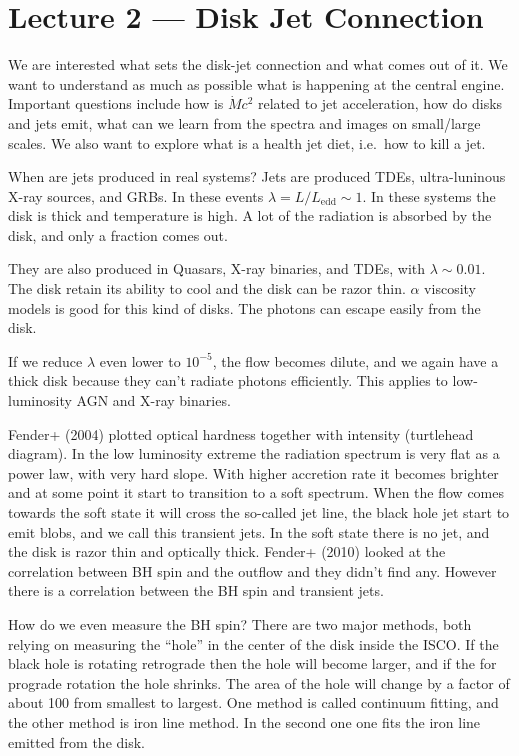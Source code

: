 \documentclass[letterpaper, 11pt]{article}
\numberwithin{equation}{section}
\numberwithin{figure}{section}
\begin{document}
\section{Lecture 2 --- Disk Jet Connection}

We are interested what sets the disk-jet connection and what comes out of it. We
want to understand as much as possible what is happening at the central engine.
Important questions include how is $\dot{M}c^2$ related to jet acceleration, how
do disks and jets emit, what can we learn from the spectra and images on
small/large scales. We also want to explore what is a health jet diet, i.e.\ how
to kill a jet.

When are jets produced in real systems? Jets are produced TDEs, ultra-luninous
X-ray sources, and GRBs. In these events $\lambda = L/L_\mathrm{edd} \sim 1$. In
these systems the disk is thick and temperature is high. A lot of the radiation
is absorbed by the disk, and only a fraction comes out.

They are also produced in Quasars, X-ray binaries, and TDEs, with $\lambda \sim
0.01$. The disk retain its ability to cool and the disk can be razor thin.
$\alpha$ viscosity models is good for this kind of disks. The photons can escape
easily from the disk.

If we reduce $\lambda$ even lower to $10^{-5}$, the flow becomes dilute, and we again have a
thick disk because they can't radiate photons efficiently. This applies to
low-luminosity AGN and X-ray binaries.

Fender+ (2004) plotted optical hardness together with intensity (turtlehead
diagram). In the low luminosity extreme the radiation spectrum is very flat as a
power law, with very hard slope. With higher accretion rate it becomes brighter
and at some point it start to transition to a soft spectrum. When the flow comes
towards the soft state it will cross the so-called jet line, the black hole jet
start to emit blobs, and we call this transient jets. In the soft state there is
no jet, and the disk is razor thin and optically thick. Fender+ (2010) looked at
the correlation between BH spin and the outflow and they didn't find any.
However there is a correlation between the BH spin and transient jets.

How do we even measure the BH spin? There are two major methods, both relying on
measuring the ``hole'' in the center of the disk inside the ISCO. If the black
hole is rotating retrograde then the hole will become larger, and if the for
prograde rotation the hole shrinks. The area of the hole will change by a factor
of about 100 from smallest to largest. One method is called continuum fitting,
and the other method is iron line method. In the second one one fits the iron
line emitted from the disk.
\end{document}

